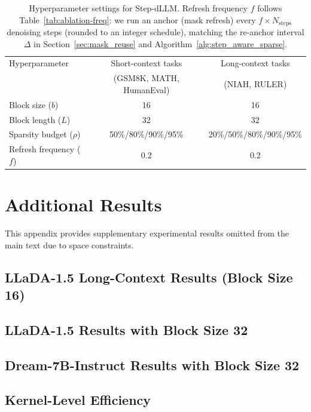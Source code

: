 \documentclass{article}
\theoremstyle{plain}
\theoremstyle{definition}
\theoremstyle{remark}
\begin{document}
\begin{table}[h]
\centering
\caption{Hyperparameter settings for Step-dLLM. Refresh frequency $f$ follows Table~\ref{tab:ablation-freq}: we run an anchor (mask refresh) every $f \times N_{\text{steps}}$ denoising steps (rounded to an integer schedule), matching the re-anchor interval $\Delta$ in Section~\ref{sec:mask_reuse} and Algorithm~\ref{alg:step_aware_sparse}.}
\label{tab:hyperparams}
\small
\begin{tabular}{lcc}
\toprule
Hyperparameter & Short-context tasks & Long-context tasks \\
 & (GSM8K, MATH, HumanEval) & (NIAH, RULER) \\
\midrule
Block size ($b$) & 16 & 16 \\
Block length ($L$) & 32 & 32 \\
Sparsity budget ($\rho$) & 50\%/80\%/90\%/95\% & 20\%/50\%/80\%/90\%/95\% \\
Refresh frequency ($f$) & 0.2 & 0.2 \\
\bottomrule
\end{tabular}
\end{table}


\section{Additional Results}
\label{app:additional-results}

This appendix provides supplementary experimental results omitted from the main text due to space constraints.

\subsection{LLaDA-1.5 Long-Context Results (Block Size 16)}
\label{app:llada-long}



\subsection{LLaDA-1.5 Results with Block Size 32}
\label{app:llada-bs32}



\subsection{Dream-7B-Instruct Results with Block Size 32}
\label{app:dream-bs32}



\subsection{Kernel-Level Efficiency}
\label{app:kernel-level}




\newpage

\end{document}
